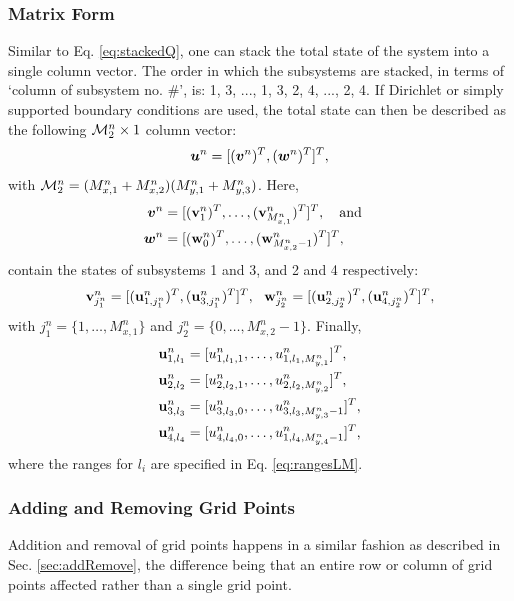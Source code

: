 \documentclass[fleqn]{jaes}
\begin{document}
\subsubsection{Matrix Form}
Similar to Eq. \eqref{eq:stackedQ}, one can stack the total state of the system into a single column vector. The order in which the subsystems are stacked, in terms of `column of subsystem no. \#', is: 1, 3, ..., 1, 3, 2, 4, ..., 2, 4. If Dirichlet or simply supported boundary conditions are used, the total state can then be described as the following ${\mathcal{M}_2^n} \times 1$ column vector:
\begin{equation}\label{eq:stacked2D}
     \uStack^n = [(\vv^n)^T, (\ww^n)^T]^T,
\end{equation}
with ${\mathcal{M}_2^n} =(M_{x, 1}^n + M_{x, 2}^n) (M_{y, 1}^n + M_{y, 3}^n)$. Here,
\begin{equation}\label{eq:vw}
\begin{aligned}
    \vv^n &= [(\v_{1}^n)^T,\hdots, (\v_{M_{x,1}^n}^n)^T]^T, \qaq\\
    \ww^n &= [(\w_{0}^n)^T, \hdots, (\w_{M_{x, 2}^n-1}^n)^T]^T,
\end{aligned}
\end{equation}
contain the states of subsystems 1 and 3, and 2 and 4 respectively:
\begin{equation*}
     \mathbf{v}_{j_1^n}^n = [(\mathbf{u}_{1, j_1^n}^n)^T, (\mathbf{u}_{3, j_1^n}^n)^T]^T, \ \ \mathbf{w}_{j_2^n}^n = [(\mathbf{u}_{2, j_2^n}^n)^T, (\mathbf{u}_{4, j_2^n}^n)^T]^T,
\end{equation*}
with $j_1^n = \{1, \hdots, M_{x,1}^n\}$ and $j_2^n = \{0, \hdots, M_{x,2}^n-1\}$. Finally, 
\begin{equation}\label{eq:2DuDefs}
    \begin{aligned}
         \u_{1,l_1}^n &= [u_{1, l_1, 1}^n, \hdots, u_{1, l_1, M_{y, 1}^n}^n]^T,
         \\
         \u_{2,l_2}^n &= [u_{2, l_2, 1}^n, \hdots, u_{2, l_2, M_{y, 2}^n}^n]^T,\\
         \u_{3,l_3}^n &= [u_{3, l_3, 0}^n, \hdots, u_{3, l_3, M_{y, 3}^n-1}^n]^T,\\
         \u_{4,l_4}^n &= [u_{4, l_4, 0}^n, \hdots, u_{1, l_4, M_{y, 4}^n-1}^n]^T,
     \end{aligned}
\end{equation}
where the ranges for $l_i$ are specified in Eq. \eqref{eq:rangesLM}.
\subsubsection{Adding and Removing Grid Points}
Addition and removal of grid points happens in a similar fashion as described in Sec. \ref{sec:addRemove}, the difference being that an entire row or column of grid points affected rather than a single grid point.
\end{document}
